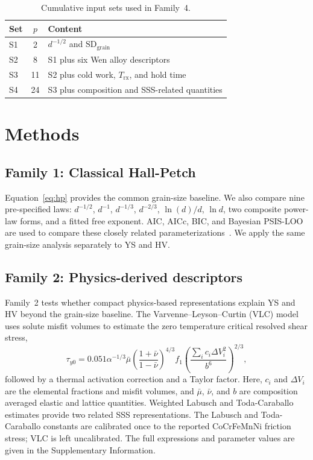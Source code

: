 \documentclass[5p,times,twocolumn]{elsarticle}
\newcommand{\familyone}{Classical Hall-Petch}
\newcommand{\familytwo}{Physics-derived descriptors}
\begin{document}
\begin{table}[H]
\centering
\caption{Cumulative input sets used in Family~4.}
\label{tab:inputs}
\footnotesize
\begin{tabular}{@{}lcp{5.6cm}@{}}
\toprule
Set & $p$ & Content \\
\midrule
S1 & 2 & $d^{-1/2}$ and $\mathrm{SD}_{\mathrm{grain}}$ \\
S2 & 8 & S1 plus six Wen alloy descriptors \\
S3 & 11 & S2 plus cold work, $T_{\mathrm{rx}}$, and hold time \\
S4 & 24 & S3 plus composition and SSS-related quantities \\
\bottomrule
\end{tabular}
\end{table}


\section{Methods}
\label{sec:methods}

\subsection{Family 1: \familyone}

Equation~\eqref{eq:hp} provides the common grain-size baseline. We also compare nine pre-specified laws: $d^{-1/2}$, $d^{-1}$, $d^{-1/3}$, $d^{-2/3}$, $\ln(d)/d$, $\ln d$, two composite power-law forms, and a fitted free exponent. AIC, AICc, BIC, and Bayesian PSIS-LOO are used to compare these closely related parameterizations~\cite{Akaike1974,Schwarz1978,Vehtari2017,Yao2018}. We apply the same grain-size analysis separately to YS and HV.

\subsection{Family 2: \familytwo}

Family~2 tests whether compact physics-based representations explain YS and HV beyond the grain-size baseline. The Varvenne--Leyson--Curtin (VLC) model uses solute misfit volumes to estimate the zero temperature critical resolved shear stress,
\begin{equation}
\tau_{y0}=0.051\alpha^{-1/3}\bar\mu
\left(\frac{1+\bar\nu}{1-\bar\nu}\right)^{4/3}f_1
\left(\frac{\sum_i c_i\Delta V_i^2}{b^6}\right)^{2/3},
\label{eq:vlc}
\end{equation}
followed by a thermal activation correction and a Taylor factor. Here, $c_i$ and $\Delta V_i$ are the elemental fractions and misfit volumes, and $\bar\mu$, $\bar\nu$, and $b$ are composition averaged elastic and lattice quantities. Weighted Labusch and Toda-Caraballo estimates provide two related SSS representations. The Labusch and Toda-Caraballo constants are calibrated once to the reported CoCrFeMnNi friction stress; VLC is left uncalibrated. The full expressions and parameter values are given in the Supplementary Information.
\end{document}
